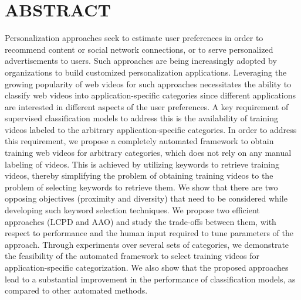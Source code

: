 

\section{ABSTRACT}
Personalization approaches seek to estimate user preferences in order to recommend content or social network connections, or to serve personalized advertisements to users. Such approaches are being increasingly adopted by organizations to build customized personalization applications. Leveraging the growing popularity of web videos for such approaches necessitates the ability to classify web videos into application-specific categories since different applications are interested in different aspects of the user preferences. A key requirement of supervised classification models to address this is the availability of training videos labeled to the arbitrary application-specific categories. In order to address this requirement, we propose a completely automated framework to obtain training web videos for arbitrary categories, which does not rely on any manual labeling of videos. This is achieved by utilizing keywords to retrieve training videos, thereby simplifying the problem of obtaining training videos to the problem of selecting keywords to retrieve them. We show that there are two opposing objectives (proximity and diversity) that need to be considered while developing such keyword selection techniques. We propose two efficient approaches (LCPD and AAO) and study the trade-offs between them, with respect to performance and the human input required to tune parameters of the approach. Through experiments over several sets of categories, we demonstrate the feasibility of the automated framework to select training videos for application-specific categorization. We also show that the proposed approaches lead to a substantial improvement in the performance of classification models, as compared to other automated methods. 













